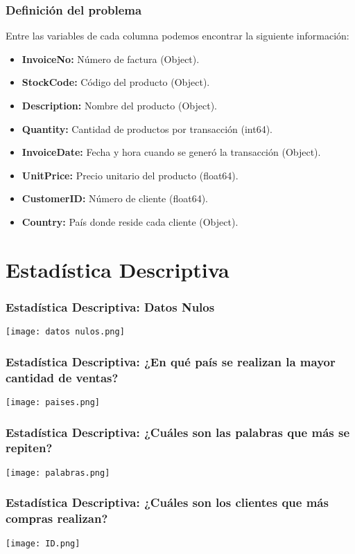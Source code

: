 \documentclass{beamer}
\begin{document}

\begin{frame}
\frametitle{Definición del problema}

Entre las variables de cada columna podemos encontrar la siguiente información:
\begin{itemize}
    \item<1-> \textbf{InvoiceNo:} Número de factura (Object).
    \item<2-> \textbf{StockCode:} Código del producto (Object).
    \item<3-> \textbf{Description:} Nombre del producto (Object).
    \item<4-> \textbf{Quantity:} Cantidad de productos por transacción (int64).
    \item<5-> \textbf{InvoiceDate:} Fecha y hora cuando se generó la transacción (Object).
    \item<6-> \textbf{UnitPrice:} Precio unitario del producto (float64).
    \item<7-> \textbf{CustomerID:} Número de cliente (float64).
    \item<8-> \textbf{Country:} País donde reside cada cliente (Object).
\end{itemize}
\end{frame}


\section{Estadística Descriptiva}
\begin{frame}

\frametitle{Estadística Descriptiva: Datos Nulos}
\begin{center} 
    \texttt{[image: datos nulos.png]}
\end{center}
\end{frame}
\begin{frame}
\frametitle{Estadística Descriptiva: ¿En qué país se realizan la mayor cantidad de ventas?}
\begin{center} 
    \texttt{[image: paises.png]}
\end{center}
\end{frame}

\begin{frame}
\frametitle{Estadística Descriptiva: ¿Cuáles son las palabras que más se repiten?}
\begin{center} 
    \texttt{[image: palabras.png]}
\end{center}
\end{frame}
\begin{frame}
\frametitle{Estadística Descriptiva: ¿Cuáles son los clientes que más compras realizan?}
\begin{center} 
    \texttt{[image: ID.png]}
\end{center}
\end{frame}
\end{document}
